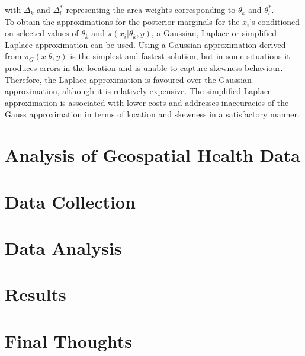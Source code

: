 \documentclass[12pt]{book}
\begin{document}
with $\Delta_k$ and $\Delta_l^*$ representing the area weights corresponding to $\theta_k$ and $\theta_l^*$. \\
To obtain the approximations for the posterior marginals for the $x_i$'s conditioned on selected values of $\theta_k$ and $\widetilde{\pi}\left(x_i|\theta_k,y\right)$, a Gaussian, Laplace or simplified Laplace approximation can be used. Using a Gaussian approximation derived from $\widetilde{\pi}_G\left(x|\theta,y\right)$ is the simplest and fastest solution, but in some situations it produces errors in the location and is unable to capture skewness behaviour. Therefore, the Laplace approximation is favoured over the Gaussian approximation, although it is relatively expensive. The simplified Laplace approximation is associated with lower costs and addresses inaccuracies of the Gauss approximation in terms of location and skewness in a satisfactory manner. \autocite[Cf.][]{moraga2019geospatial}
\chapter{Analysis of Geospatial Health Data}
\chapter{Data Collection}
\chapter{Data Analysis}
\chapter{Results}
\chapter{Final Thoughts}
\end{document}
